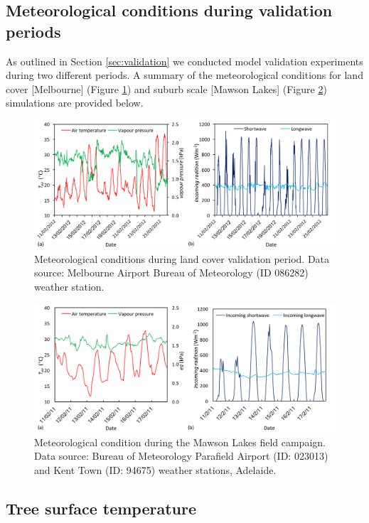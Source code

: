 \documentclass[final,3p,times,authoryear]{elsarticle}
\begin{document}
\subsection{Meteorological conditions during validation periods}

As outlined in Section \ref{sec:validation} we conducted model validation experiments during two different periods. A summary of the meteorological conditions for  land cover [Melbourne] (Figure \ref{fig:met}) and suburb scale [Mawson Lakes] (Figure \ref{fig:met3}) simulations are provided below.

\begin{figure}[!htbp]
\includegraphics[width=1\textwidth,keepaspectratio]{figure11.png}
 \caption{Meteorological conditions during land cover validation period. Data source: Melbourne Airport Bureau of Meteorology (ID 086282) weather station.} \label{fig:met}
\end{figure}

\begin{figure}[!htbp]
\includegraphics[width=1\textwidth,keepaspectratio]{figure12.png}
 \caption{Meteorological condition during the Mawson Lakes field campaign. Data source: Bureau of Meteorology Parafield Airport (ID: 023013) and Kent Town (ID: 94675) weather stations, Adelaide.} \label{fig:met3}
\end{figure}


\subsection{Tree surface temperature}\label{app:tree_surf}  
\end{document}

